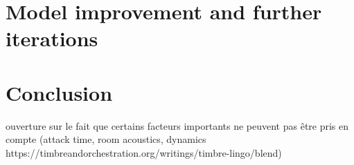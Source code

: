 \documentclass[11pt, a4paper]{article}
\begin{document}
\section{Model improvement and further iterations}

\section{Conclusion}

ouverture sur le fait que certains facteurs importants ne peuvent pas être pris en compte (attack time, room acoustics, dynamics https://timbreandorchestration.org/writings/timbre-lingo/blend)

\newpage

\printbibliography%
\end{document}

